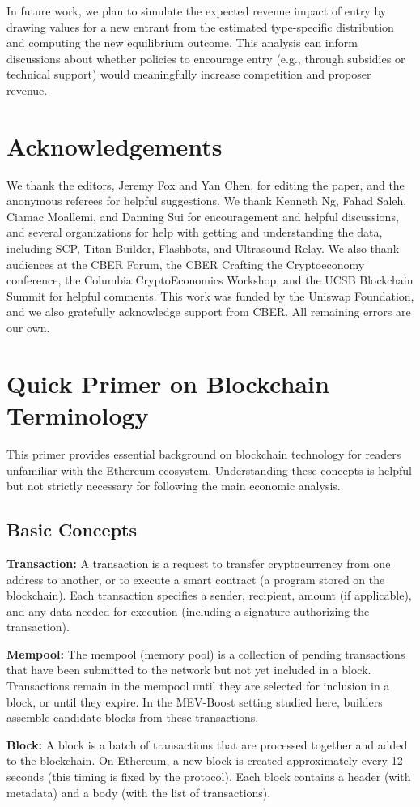 \documentclass[12pt,reqno]{amsart}
\newcommand{\acknowledgementtext}{We thank the editors, Jeremy Fox and Yan Chen, for editing the paper, and the anonymous referees for helpful suggestions. We thank Kenneth Ng, Fahad Saleh, Ciamac Moallemi, and Danning Sui for encouragement and helpful discussions, and several organizations for help with getting and understanding the data, including SCP, Titan Builder, Flashbots, and Ultrasound Relay. We also thank audiences at the CBER Forum, the CBER Crafting the Cryptoeconomy conference, the Columbia CryptoEconomics Workshop, and the UCSB Blockchain Summit for helpful comments. This work was funded by the Uniswap Foundation, and we also gratefully acknowledge support from CBER. All remaining errors are our own.}
\begin{document}
In future work, we plan to simulate the expected revenue impact of entry by drawing values for a new entrant from the estimated type-specific distribution and computing the new equilibrium outcome. This analysis can inform discussions about whether policies to encourage entry (e.g., through subsidies or technical support) would meaningfully increase competition and proposer revenue.

\section*{Acknowledgements}
\acknowledgementtext 

\newpage




\appendix

\section{Quick Primer on Blockchain Terminology}
\label{app:primer}

This primer provides essential background on blockchain technology for readers unfamiliar with the Ethereum ecosystem. Understanding these concepts is helpful but not strictly necessary for following the main economic analysis.

\subsection{Basic Concepts}

\textbf{Transaction:} A transaction is a request to transfer cryptocurrency from one address to another, or to execute a smart contract (a program stored on the blockchain). Each transaction specifies a sender, recipient, amount (if applicable), and any data needed for execution (including a signature authorizing the transaction).

\textbf{Mempool:} The mempool (memory pool) is a collection of pending transactions that have been submitted to the network but not yet included in a block. Transactions remain in the mempool until they are selected for inclusion in a block, or until they expire. In the MEV-Boost setting studied here, builders assemble candidate blocks from these transactions.

\textbf{Block:} A block is a batch of transactions that are processed together and added to the blockchain. On Ethereum, a new block is created approximately every 12 seconds (this timing is fixed by the protocol). Each block contains a header (with metadata) and a body (with the list of transactions).
\end{document}
